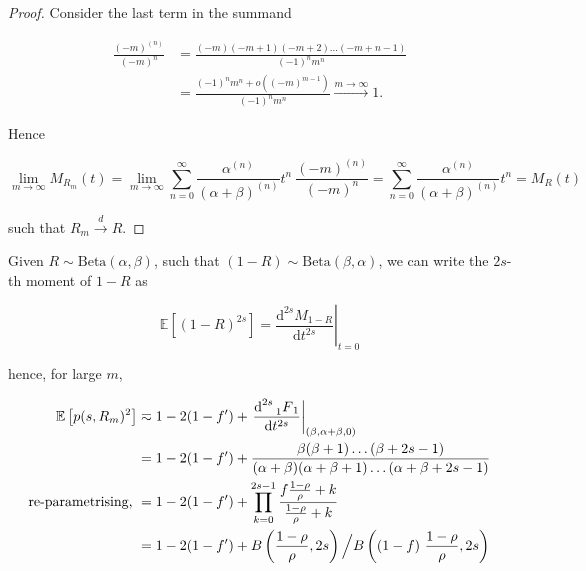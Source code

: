 \documentclass[american, abstract=on]{scrartcl}
\theoremstyle{plain}
\newcommand{\E}{\mathbb{E}}
\newcommand{\Beta}{\text{Beta}}
\begin{document}
\begin{proof}
    
    Consider the last term in the summand 

    \begin{equation}
        \begin{split}
            \frac{(-m)^{(n)}}{(-m)^n} &= \frac{(-m)(-m + 1)(-m + 2)\ldots(-m + n - 1)}{(-1)^n m^n} \\
            &= \frac{(-1)^n m^n + o((-m)^{m - 1})}{(-1)^n m^n} \xrightarrow{m\rightarrow \infty} 1.
        \end{split}
    \end{equation}

    Hence 

    \begin{equation}
        \lim_{m \rightarrow \infty} M_{R_m}(t) = \lim_{m \rightarrow \infty}\sum^{\infty}_{n=0} \frac{\alpha^{(n)}}{(\alpha + \beta)^{(n)}} t^n \  \frac{(-m)^{(n)}}{(-m)^n} = \sum^{\infty}_{n=0} \frac{\alpha^{(n)}}{(\alpha + \beta)^{(n)}} t^n = M_R(t)
    \end{equation}

    such that $R_m \xrightarrow{d} R$.

\end{proof}

Given $R \sim \Beta(\alpha, \beta)$, such that $(1 - R) \sim \Beta(\beta, \alpha)$, we can write the $2s$-th moment of $1 - R$ as 

\begin{equation}
    \E[(1 - R)^{2s}] =  \left.\frac{\text{d}^{2s} M_{1 - R}}{\text{d}t^{2s}}\right\rvert_{t = 0} 
\end{equation}

hence, for large $m$,

\begin{equation}
    \begin{split}
        \E \left[p(s, R_m)^2\right] &\eqsim 1 - 2(1 - f') + \left.\frac{\text{d}^{2s} \prescript{}{1}{F}_1}{\text{d}t^{2s}} \right\rvert_{(\beta, \alpha + \beta, 0)} \\
        &= 1 - 2(1 - f') + \frac{\beta(\beta + 1)\ldots(\beta + 2s - 1)}{(\alpha + \beta)(\alpha + \beta + 1) \ldots (\alpha + \beta + 2s - 1)} \\
        \text{re-parametrising, } &= 1 - 2(1 - f') + \prod^{2s - 1}_{k = 0} \frac{f \frac{1 - \rho}{\rho} + k}{\frac{1 - \rho}{\rho} + k} \\
        &= 1 - 2(1 - f') + B\left(\frac{1 - \rho}{\rho}, 2s \right) \Big/ B\left((1 - f) \ \frac{1 - \rho}{\rho}, 2s \right)
    \end{split}
\end{equation}
\end{document}
